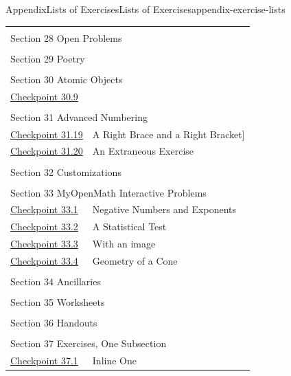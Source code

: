 \documentclass[twoside,10pt,]{article}
\numberwithin{equation}{section}
\begin{document}
\begin{appendixptx}{Appendix}{Lists of Exercises}{}{Lists of Exercises}{}{}{appendix-exercise-lists}
\begin{longtable}[l]{ll}
\multicolumn{2}{l}{\null}\\[1.5ex] \multicolumn{2}{l}{\large Section 28 Open Problems}\\[0.5ex]
\multicolumn{2}{l}{\null}\\[1.5ex] \multicolumn{2}{l}{\large Section 29 Poetry}\\[0.5ex]
\multicolumn{2}{l}{\null}\\[1.5ex] \multicolumn{2}{l}{\large Section 30 Atomic Objects}\\[0.5ex]
\hyperref[atomic-image-25]{Checkpoint 30.9}& \\
\multicolumn{2}{l}{\null}\\[1.5ex] \multicolumn{2}{l}{\large Section 31 Advanced Numbering}\\[0.5ex]
\hyperref[exercise-difficult-title]{Checkpoint 31.19}& A Right Brace \textbraceright{} and a Right Bracket]\\
\hyperref[section-advanced-numbering-12-2]{Checkpoint 31.20}& An Extraneous Exercise\\
\multicolumn{2}{l}{\null}\\[1.5ex] \multicolumn{2}{l}{\large Section 32 Customizations}\\[0.5ex]
\multicolumn{2}{l}{\null}\\[1.5ex] \multicolumn{2}{l}{\large Section 33 MyOpenMath Interactive Problems}\\[0.5ex]
\hyperref[section-myopenmath-3]{Checkpoint 33.1}& Negative Numbers and Exponents\\
\hyperref[section-myopenmath-4]{Checkpoint 33.2}& A Statistical Test\\
\hyperref[section-myopenmath-5]{Checkpoint 33.3}& With an image\\
\hyperref[section-myopenmath-6]{Checkpoint 33.4}& Geometry of a Cone\\
\multicolumn{2}{l}{\null}\\[1.5ex] \multicolumn{2}{l}{\large Section 34 Ancillaries}\\[0.5ex]
\multicolumn{2}{l}{\null}\\[1.5ex] \multicolumn{2}{l}{\large Section 35 Worksheets}\\[0.5ex]
\multicolumn{2}{l}{\null}\\[1.5ex] \multicolumn{2}{l}{\large Section 36 Handouts}\\[0.5ex]
\multicolumn{2}{l}{\null}\\[1.5ex] \multicolumn{2}{l}{\large Section 37 Exercises, One Subsection}\\[0.5ex]
\hyperref[section-exercises-single-5]{Checkpoint 37.1}& Inline One\\

\end{longtable}
\end{appendixptx}
\end{document}
